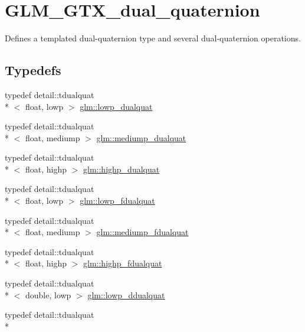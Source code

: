\hypertarget{group__gtc__dual__quaternion}{\section{G\-L\-M\-\_\-\-G\-T\-X\-\_\-dual\-\_\-quaternion}
\label{group__gtc__dual__quaternion}
}


Defines a templated dual-\/quaternion type and several dual-\/quaternion operations.  


\subsection*{Typedefs}
\begin{DoxyCompactItemize}
\item 
typedef detail\-::tdualquat\\*
$<$ float, lowp $>$ \hyperlink{group__gtc__dual__quaternion_gae1772179edc60f4e8b46c8772eeeccee}{glm\-::lowp\-\_\-dualquat}
\item 
typedef detail\-::tdualquat\\*
$<$ float, mediump $>$ \hyperlink{group__gtc__dual__quaternion_ga71fc1c10a382330c1fee55ce29703405}{glm\-::mediump\-\_\-dualquat}
\item 
typedef detail\-::tdualquat\\*
$<$ float, highp $>$ \hyperlink{group__gtc__dual__quaternion_gaf3a01deb502f53ca555ee1d45e6d6776}{glm\-::highp\-\_\-dualquat}
\item 
typedef detail\-::tdualquat\\*
$<$ float, lowp $>$ \hyperlink{group__gtc__dual__quaternion_gae62c636c63c9eb3c1ea6d10f4b7d7c81}{glm\-::lowp\-\_\-fdualquat}
\item 
typedef detail\-::tdualquat\\*
$<$ float, mediump $>$ \hyperlink{group__gtc__dual__quaternion_gab211d24786158490e57dfa57d7744f71}{glm\-::mediump\-\_\-fdualquat}
\item 
typedef detail\-::tdualquat\\*
$<$ float, highp $>$ \hyperlink{group__gtc__dual__quaternion_ga2ed3283c09d3ffaf52a0e0a4b248eab6}{glm\-::highp\-\_\-fdualquat}
\item 
typedef detail\-::tdualquat\\*
$<$ double, lowp $>$ \hyperlink{group__gtc__dual__quaternion_ga29461fddd543ffdf65a199fc28c42458}{glm\-::lowp\-\_\-ddualquat}
\item 
typedef detail\-::tdualquat\\*

\end{DoxyCompactItemize}
